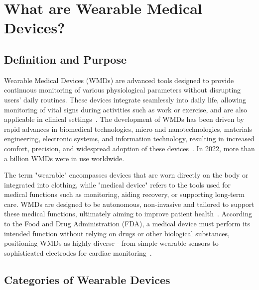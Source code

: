 \documentclass[journal]{IEEEtran}
\begin{document}

\section{What are Wearable Medical Devices?}
\label{2.What_are}
    \subsection{Definition and Purpose}

    Wearable Medical Devices (WMDs) are advanced tools designed to provide continuous monitoring of various physiological parameters without disrupting users' daily routines. These devices integrate seamlessly into daily life, allowing monitoring of vital signs during activities such as work or exercise, and are also applicable in clinical settings~\cite{Fotiadis2006}. The development of WMDs has been driven by rapid advances in biomedical technologies, micro and nanotechnologies, materials engineering, electronic systems, and information technology, resulting in increased comfort, precision, and widespread adoption of these devices~\cite{Degerli2020, Fotiadis2006}. In 2022, more than a billion WMDs were in use worldwide.

    The term "wearable" encompasses devices that are worn directly on the body or integrated into clothing, while "medical device" refers to the tools used for medical functions such as monitoring, aiding recovery, or supporting long-term care. WMDs are designed to be autonomous, non-invasive and tailored to support these medical functions, ultimately aiming to improve patient health~\cite{Degerli2020, Hemapriya2017}. According to the Food and Drug Administration (FDA), a medical device must perform its intended function without relying on drugs or other biological substances, positioning WMDs as highly diverse - from simple wearable sensors to sophisticated electrodes for cardiac monitoring~\cite{Khan2016, Ates2022}.

    \subsection{Categories of Wearable Devices}
    
\end{document}
